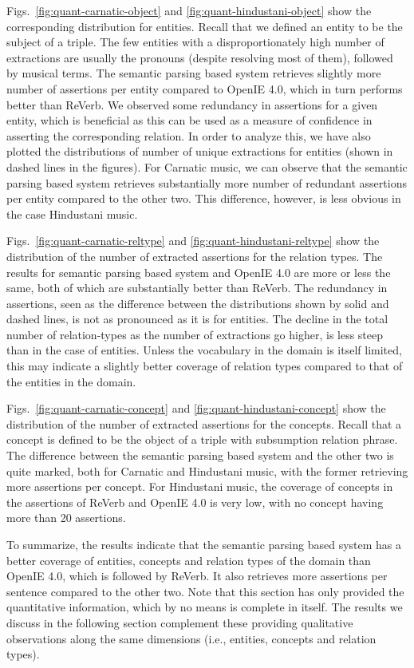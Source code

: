 \documentclass{llncs}
\begin{document}
Figs.~\ref{fig:quant-carnatic-object} and \ref{fig:quant-hindustani-object} show the corresponding distribution for entities. Recall that we defined an entity to be the subject of a triple. The few entities with a disproportionately high number of extractions are usually the pronouns (despite resolving most of them), followed by musical terms. The semantic parsing based system retrieves slightly more number of assertions per entity compared to OpenIE 4.0, which in turn performs better than ReVerb. We observed some redundancy in assertions for a given entity, which is beneficial as this can be used as a measure of confidence in asserting the corresponding relation. In order to analyze this, we have also plotted the distributions of number of unique extractions for entities (shown in dashed lines in the figures). For Carnatic music, we can observe that the semantic parsing based system retrieves substantially more number of redundant assertions per entity compared to the other two. This difference, however, is less obvious in the case Hindustani music.

Figs.~\ref{fig:quant-carnatic-reltype} and \ref{fig:quant-hindustani-reltype} show the distribution of the number of extracted assertions for the relation types. The results for semantic parsing based system and OpenIE 4.0 are more or less the same, both of which are substantially better than ReVerb. The redundancy in assertions, seen as the difference between the distributions shown by solid and dashed lines, is not as pronounced as it is for entities. The decline in the total number of relation-types as the number of extractions go higher, is less steep than in the case of entities. Unless the vocabulary in the domain is itself limited, this may indicate a slightly better coverage of relation types compared to that of the entities in the domain.


Figs.~\ref{fig:quant-carnatic-concept} and \ref{fig:quant-hindustani-concept} show the distribution of the number of extracted assertions for the concepts. Recall that a concept is defined to be the object of a triple with subsumption relation phrase. The difference between the semantic parsing based system and the other two is quite marked, both for Carnatic and Hindustani music, with the former retrieving more assertions per concept. For Hindustani music, the coverage of concepts in the assertions of ReVerb and OpenIE 4.0 is very low, with no concept having more than 20 assertions.

To summarize, the results indicate that the semantic parsing based system has a better coverage of entities, concepts and relation types of the domain than OpenIE 4.0, which is followed by ReVerb. It also retrieves more assertions per sentence compared to the other two. Note that this section has only provided the quantitative information, which by no means is complete in itself. The results we discuss in the following section complement these providing qualitative observations along the same dimensions (i.e., entities, concepts and relation types).
\end{document}
